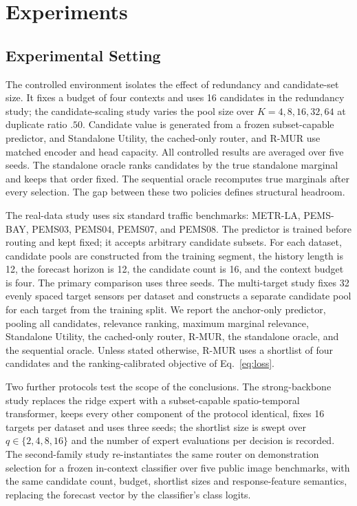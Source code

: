 \section{Experiments}

\subsection{Experimental Setting}

The controlled environment isolates the effect of redundancy and candidate-set
size. It fixes a budget of four contexts and uses 16 candidates in the
redundancy study; the candidate-scaling study varies the pool size over
$K=4,8,16,32,64$ at duplicate ratio $.50$. Candidate value is generated from
a frozen subset-capable predictor, and Standalone Utility, the cached-only
router, and R-MUR use matched encoder and head capacity. All controlled
results are averaged over five seeds. The standalone oracle ranks candidates
by the true standalone marginal and keeps that order fixed. The sequential
oracle recomputes true marginals after every selection. The gap between these
two policies defines structural headroom.

The real-data study uses six standard traffic benchmarks: METR-LA, PEMS-BAY,
PEMS03, PEMS04, PEMS07, and PEMS08. The predictor is trained before routing
and kept fixed; it accepts arbitrary candidate subsets. For each dataset,
candidate pools are constructed from the training segment, the history length
is 12, the forecast horizon is 12, the candidate count is 16, and the context
budget is four. The primary comparison uses three seeds. The multi-target study
fixes 32 evenly spaced target sensors per dataset and constructs a separate
candidate pool for each target from the training split. We report the
anchor-only predictor, pooling all candidates, relevance ranking, maximum
marginal relevance, Standalone Utility, the cached-only router, R-MUR, the
standalone oracle, and the sequential oracle. Unless stated otherwise, R-MUR
uses a shortlist of four candidates and the ranking-calibrated objective of
Eq.~\eqref{eq:loss}.

Two further protocols test the scope of the conclusions. The strong-backbone
study replaces the ridge expert with a subset-capable spatio-temporal
transformer, keeps every other component of the protocol identical, fixes 16
targets per dataset and uses three seeds; the shortlist size is swept over
$q\in\{2,4,8,16\}$ and the number of expert evaluations per decision is
recorded. The second-family study re-instantiates the same router on
demonstration selection for a frozen in-context classifier over five public
image benchmarks, with the same candidate count, budget, shortlist sizes and
response-feature semantics, replacing the forecast vector by the classifier's
class logits.

